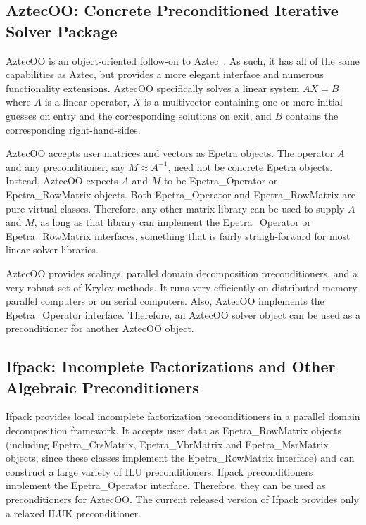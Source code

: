 \documentclass[12pt,relax]{SANDreport}
\begin{document}
\subsection{AztecOO: Concrete Preconditioned Iterative Solver Package}

AztecOO is an object-oriented follow-on to Aztec~\cite{Aztec2.1}.  As such, it has
all of the same capabilities as Aztec, but provides a more elegant interface and numerous functionality
extensions.  AztecOO specifically solves a linear system $AX=B$ where $A$ is a linear 
operator, $X$ is a multivector containing one or more initial guesses on entry and the
corresponding solutions on exit, and $B$ contains the corresponding right-hand-sides.

AztecOO accepts user matrices and vectors as Epetra objects.  The operator $A$ and any
preconditioner, say $M \approx A^{-1}$, need not be concrete Epetra objects.
Instead, AztecOO expects $A$ and $M$ to be Epetra\_Operator or Epetra\_RowMatrix objects. 
Both Epetra\_Operator and Epetra\_RowMatrix are pure virtual classes.  Therefore, any other
matrix library can be used to supply $A$ and $M$, as long as that library can implement
the  Epetra\_Operator or Epetra\_RowMatrix interfaces, something that is fairly straigh-forward
 for most linear solver libraries.

AztecOO provides scalings, parallel domain decomposition preconditioners, and a very robust
set of Krylov methods.  It runs very efficiently on distributed memory parallel computers or
on serial computers.  Also, AztecOO implements the Epetra\_Operator interface.  Therefore,
an AztecOO solver object can be used as a preconditioner for another AztecOO object.

\subsection{Ifpack: Incomplete Factorizations and Other Algebraic Preconditioners}

Ifpack provides local incomplete factorization preconditioners in a
parallel domain decomposition framework.  It accepts user data as Epetra\_RowMatrix objects
(including Epetra\_CrsMatrix, Epetra\_VbrMatrix and Epetra\_MsrMatrix objects, since these
classes implement the Epetra\_RowMatrix interface)
and can construct a large variety of ILU preconditioners.  Ifpack preconditioners implement
the Epetra\_Operator interface.  Therefore, they can be used as preconditioners for AztecOO.
The current released version of Ifpack provides only a relaxed ILUK preconditioner.
\end{document}
